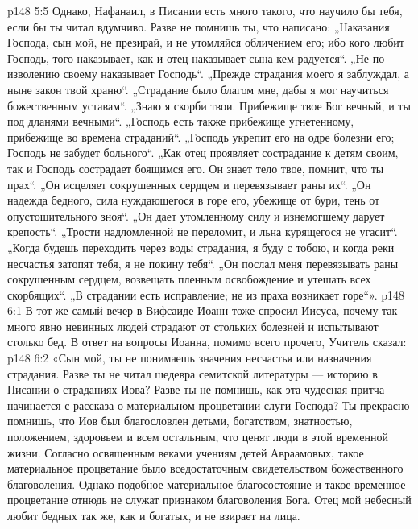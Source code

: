 \vs p148 5:5 Однако, Нафанаил, в Писании есть много такого, что научило бы тебя, если бы ты читал вдумчиво. Разве не помнишь ты, что написано: „Наказания Господа, сын мой, не презирай, и не утомляйся обличением его; ибо кого любит Господь, того наказывает, как и отец наказывает сына кем радуется“. „Не по изволению своему наказывает Господь“. „Прежде страдания моего я заблуждал, а ныне закон твой храню“. „Страдание было благом мне, дабы я мог научиться божественным уставам“. „Знаю я скорби твои. Прибежище твое Бог вечный, и ты под дланями вечными“. „Господь есть также прибежище угнетенному, прибежище во времена страданий“. „Господь укрепит его на одре болезни его; Господь не забудет больного“. „Как отец проявляет сострадание к детям своим, так и Господь сострадает боящимся его. Он знает тело твое, помнит, что ты прах“. „Он исцеляет сокрушенных сердцем и перевязывает раны их“. „Он надежда бедного, сила нуждающегося в горе его, убежище от бури, тень от опустошительного зноя“. „Он дает утомленному силу и изнемогшему дарует крепость“. „Трости надломленной не переломит, и льна курящегося не угасит“. „Когда будешь переходить через воды страдания, я буду с тобою, и когда реки несчастья затопят тебя, я не покину тебя“. „Он послал меня перевязывать раны сокрушенным сердцем, возвещать пленным освобождение и утешать всех скорбящих“. „В страдании есть исправление; не из праха возникает горе“».
\vs p148 6:1 В тот же самый вечер в Вифсаиде Иоанн тоже спросил Иисуса, почему так много явно невинных людей страдают от стольких болезней и испытывают столько бед. В ответ на вопросы Иоанна, помимо всего прочего, Учитель сказал:
\vs p148 6:2 \pc «Сын мой, ты не понимаешь значения несчастья или назначения страдания. Разве ты не читал шедевра семитской литературы --- историю в Писании о страданиях Иова? Разве ты не помнишь, как эта чудесная притча начинается с рассказа о материальном процветании слуги Господа? Ты прекрасно помнишь, что Иов был благословлен детьми, богатством, знатностью, положением, здоровьем и всем остальным, что ценят люди в этой временной жизни. Согласно освященным веками учениям детей Авраамовых, такое материальное процветание было вседостаточным свидетельством божественного благоволения. Однако подобное материальное благосостояние и такое временное процветание отнюдь не служат признаком благоволения Бога. Отец мой небесный любит бедных так же, как и богатых, и не взирает на лица.

